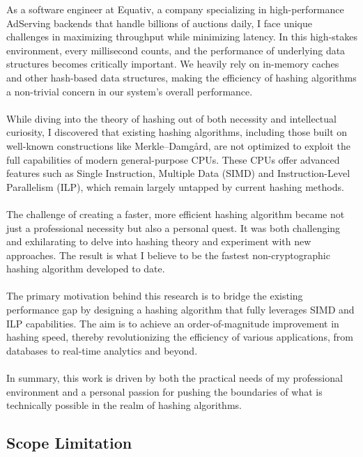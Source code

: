 \documentclass[10pt]{article}
\begin{document}
As a software engineer at Equativ, a company specializing in high-performance AdServing backends that handle billions of auctions daily,
I face unique challenges in maximizing throughput while minimizing latency. In this high-stakes environment, every millisecond counts, and the performance of underlying data structures becomes critically important. We heavily rely on in-memory caches and other hash-based data structures, making the efficiency of hashing algorithms a non-trivial concern in our system's overall performance.\\\\
While diving into the theory of hashing out of both necessity and intellectual curiosity, I discovered that existing hashing algorithms, including those built on well-known constructions like Merkle–Damgård, are not optimized to exploit the full capabilities of modern general-purpose CPUs.
These CPUs offer advanced features such as Single Instruction, Multiple Data (SIMD) and Instruction-Level Parallelism (ILP), which remain largely untapped by current hashing methods.\\\\
The challenge of creating a faster, more efficient hashing algorithm became not just a professional necessity but also a personal quest.
It was both challenging and exhilarating to delve into hashing theory and experiment with new approaches. The result is what I believe to be the fastest non-cryptographic hashing algorithm developed to date.\\\\
The primary motivation behind this research is to bridge the existing performance gap by designing a hashing algorithm that fully leverages SIMD and ILP capabilities. The aim is to achieve an order-of-magnitude improvement in hashing speed, thereby revolutionizing the efficiency of various applications, from databases to real-time analytics and beyond.\\\\
In summary, this work is driven by both the practical needs of my professional environment and a personal passion for pushing the boundaries of what is technically possible in the realm of hashing algorithms.

\subsection{Scope Limitation}
\end{document}
